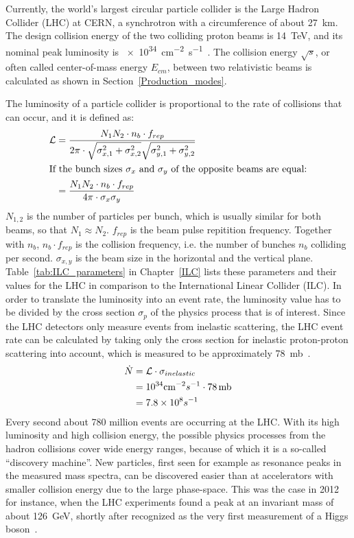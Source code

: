 Currently, the world's largest circular particle collider is the Large Hadron Collider (LHC) at CERN, a synchrotron with a circumference of about \SI{27}{\kilo\meter}.
The design collision energy of the two colliding proton beams is \SI{14}{\TeV}, and its nominal peak luminosity \lumi is \SI{e34}{\centi\meter^{-2}\second^{-1}}~\cite[p. 3]{LHC_Paper}.
The collision energy $\sqrt{s}$, or often called center-of-mass energy $E_{cm}$, between two relativistic beams is calculated as shown in Section~\ref{Production_modes}.

The luminosity of a particle collider is proportional to the rate of collisions that can occur, and it is defined as:
\begin{align}
 \mathcal{L}&=\frac{N_1N_2 \cdot n_b \cdot f_{rep}}{2\pi \cdot \sqrt{\sigma^2_{x,1}+\sigma^2_{x,2}} \sqrt{\sigma^2_{y,1}+\sigma^2_{y,2}}}\\
 \intertext{If the bunch sizes $\sigma_x$ and $\sigma_y$ of the opposite beams are equal:}
 &=\frac{N_1N_2 \cdot n_b \cdot f_{rep}}{4\pi \cdot \sigma_x \sigma_y}
 \label{eq:luminosity}
\end{align}
$N_{1,2}$ is the number of particles per bunch, which is usually similar for both beams, so that $N_1\approx N_2$.
$f_{rep}$ is the beam pulse repitition frequency.
Together with $n_b$, $n_{b}\cdot f_{rep}$ is the collision frequency, i.e. the number of bunches $n_{b}$ colliding per second.
$\sigma_{x,y}$ is the beam size in the horizontal and the vertical plane.
Table~\ref{tab:ILC_parameters} in Chapter~\ref{ILC} lists these parameters and their values for the LHC in comparison to the International Linear Collider (ILC).
In order to translate the luminosity into an event rate, the luminosity value has to be divided by the cross section $\sigma_p$ of the physics process that is of interest.
Since the LHC detectors only measure events from inelastic scattering, the LHC event rate can be calculated by taking only the cross section for inelastic proton-proton scattering into account, which is measured to be approximately \SI{78}{\milli\barn}~\cite{inelXSection}.
\begin{align}
 \dot{N}&=\mathcal{L}\cdot\sigma_{inelastic}\\
 &=10^{34} \textrm{cm}^{-2}s^{-1} \cdot 78\textrm{\,mb}\\
 &=7.8\times 10^8 s^{-1}
\end{align}
Every second about 780 million events are occurring at the LHC.
With its high luminosity and high collision energy, the possible physics processes from the hadron collisions cover wide energy ranges, because of which it is a so-called ``discovery machine''.
New particles, first seen for example as resonance peaks in the measured mass spectra, can be discovered easier than at accelerators with smaller collision energy due to the large phase-space.
This was the case in 2012 for instance, when the LHC experiments found a peak at an invariant mass of about \SI{126}{\GeV}, shortly after recognized as the very first measurement of a Higgs boson~\cite{Higgs,Higgs2}.


